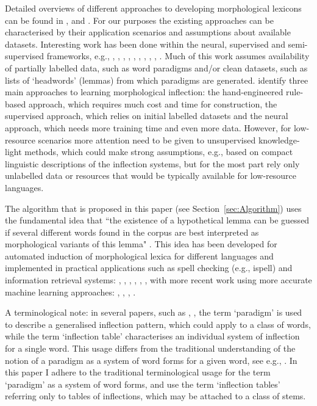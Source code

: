 \documentclass[11pt,a4paper]{article}
\begin{document}
Detailed overviews of different approaches to developing morphological lexicons can be found in \cite{ahlberg2015paradigm}, \cite{koskenniemi2018guessing} and  \cite{fam2018ips}. For our purposes the existing approaches can be characterised by their application scenarios and assumptions about available datasets. Interesting work has been done within the neural, supervised and semi-supervised frameworks, e.g., \cite{ahlberg2015paradigm}, \cite{hulden2014semi}, \cite{koskenniemi2018guessing}, \cite{silfverberg2018computational}, \cite{wolf2018structured}, \cite{kirov2018recurrent}, \cite{faruqui2016morpho}, \cite{faruqui2015morphological}, \cite{aharoni2016morphological}, \cite{cotterell2017paradigm}. Much of this work assumes availability of partially labelled data, such as word paradigms and/or clean datasets, such as lists of `headwords' (lemmas) from which paradigms are generated. \cite{fam2018ips} identify three main approaches to learning morphological inflection: the hand-engineered rule-based approach, which requires much cost and time for construction, the supervised approach, which relies on initial labelled datasets and the neural approach, which needs more training time and even more data. However, for low-resource scenarios more attention need to be given to unsupervised knowledge-light methods, which could make strong assumptions, e.g., based on compact  linguistic descriptions of the inflection systems, but for the most part rely only unlabelled data or resources that would be typically available for low-resource languages.

The algorithm that is proposed in this paper (see Section~\ref{sec:Algorithm}) uses the fundamental idea that ``the existence of a hypothetical lemma can be guessed if several different words found in the corpus are best interpreted as morphological variants of this lemma" \cite{clement2004morphology}. This idea has been developed for automated induction of morphological lexica for different languages and implemented in practical applications such as spell checking (e.g., ispell) and information retrieval systems: \cite{krovetz1993viewing}, \cite{grefenstette2002expanding}, \cite{segalovich2003fast},  \cite{clement2004morphology}, \cite{oliver2004enlarging}, \cite{sagot2005automatic}, with more recent work using more accurate machine learning approaches: \cite{vsnajder2013models}, \cite{hulden2014semi}, \cite{ahlberg2015paradigm}, \cite{ljubevsic2015predicting}.

A terminological note: in several papers, such as \cite{ahlberg2015paradigm}, \cite{silfverberg2018computational}, the term `paradigm' is used to describe a generalised inflection pattern, which could apply to a class of words, while the term `inflection table' characterises an individual system of inflection for a single word. This usage differs from the traditional understanding of the notion of a paradigm as a system of word forms for a given word, see e.g., \cite{spencer2001paradigm}. In this paper I adhere to the traditional terminological usage for the term `paradigm' as a system of word forms, and use the term `inflection tables' referring only to tables of inflections, which may be attached to a class of stems.
\end{document}
